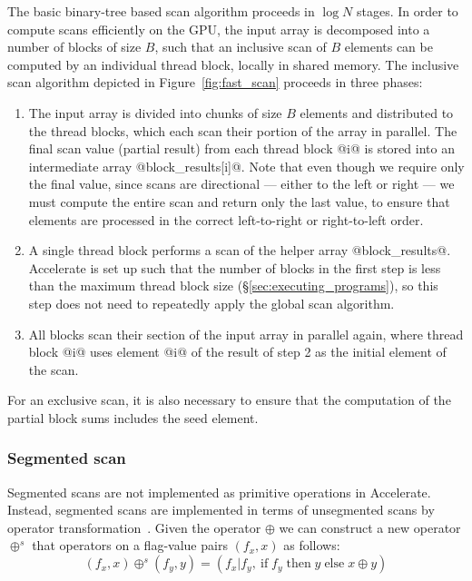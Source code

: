 The basic binary-tree based scan algorithm proceeds in $\log
N$ stages.
In order to compute scans efficiently on the GPU\gpu{}, the input array is
decomposed into a number of blocks of size $B$, such that an inclusive scan of
$B$ elements can be computed by an individual thread block,
locally in shared memory\cuda{}. The inclusive scan algorithm
depicted in Figure~\ref{fig:fast_scan} proceeds in three phases:
%
\begin{enumerate}
\item The input array is divided into chunks of size $B$ elements and
    distributed to the thread blocks, which each scan their
    portion of the array in parallel. The final scan value (partial result) from
    each thread block @i@ is stored into an intermediate array
    @block_results[i]@. Note that even though we require only the final value,
    since scans are directional --- either to the left or right --- we must
    compute the entire scan and return only the last value, to ensure that
    elements are processed in the correct left-to-right or right-to-left order.

\item A single thread block performs a scan of the helper array @block_results@.
    Accelerate is set up such that the number of blocks in the first step is
    less than the maximum thread block size (\S\ref{sec:executing_programs}), so
    this step does not need to repeatedly apply the global scan algorithm.

\item All blocks scan their section of the input array in parallel again, where
    thread block @i@ uses element @i@ of the result of step 2 as the initial
    element of the scan.

\end{enumerate}

For an exclusive scan, it is also necessary to ensure that the computation of
the partial block sums includes the seed element.


\subsubsection{Segmented scan}

Segmented scans are not implemented as primitive operations in Accelerate.
Instead, segmented scans are implemented in terms of unsegmented scans by
operator transformation~\cite{Schwartz:1980cy,Blelloch:1990ts}. Given the
operator $\oplus$ we can construct a new operator $\oplus^s$ that operators on a
flag-value pairs $\left( f_x, x \right)$ as follows:
%
\begin{equation*}
    \left( f_x, x \right) \oplus^s \left( f_y, y \right)
        = \left( f_x | f_y,\:\mathrm{if}\;f_y\;\mathrm{then}\;y\;\mathrm{else}\;x\oplus y \right)
\end{equation*}

